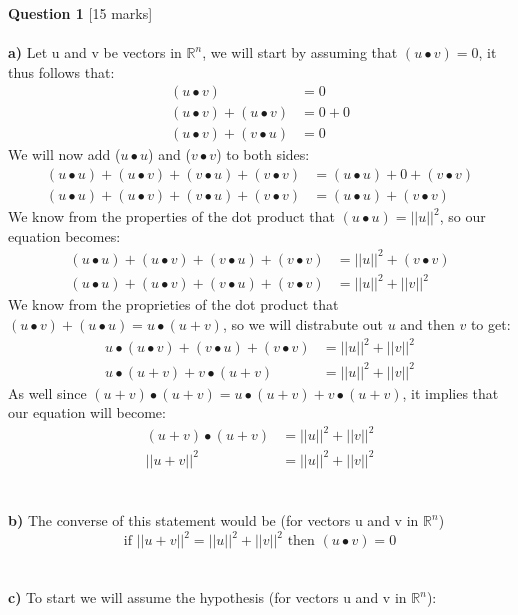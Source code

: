 \documentclass[11pt]{article}
\begin{document}
\textbf{Question 1} [15 marks] \\\\
\textbf{a)} Let u and v be vectors in $\mathbb{R}^n$, we will start by assuming that $(u \bullet v) = 0$, it thus follows that:
\begin{align*}
(u \bullet v)  &= 0 \\
(u \bullet v)  + (u \bullet v) &= 0 + 0\\
(u \bullet v) + (v \bullet u) &= 0
\end{align*}
We will now add ($u \bullet u$) and ($v \bullet v$) to both sides:
\begin{align*}
(u \bullet u) + (u \bullet v)  + (v \bullet u) + (v \bullet v)  &=(u \bullet u) + 0 + (v \bullet v)\\
(u \bullet u) + (u \bullet v)  + (v \bullet u) + (v \bullet v)  &=(u \bullet u) + (v \bullet v)
\end{align*}
We know from the properties of the dot product that $(u\bullet u) = ||u||^2$, so our equation becomes:
\begin{align*}
(u \bullet u) + (u \bullet v)  + (v \bullet u) + (v \bullet v)  &=||u||^2 + (v \bullet v)\\
(u \bullet u) + (u \bullet v)  + (v \bullet u) + (v \bullet v)  &=||u||^2 + ||v||^2
\end{align*}
We know from the proprieties of the dot product that $(u \bullet v) + (u \bullet u) = u \bullet (u+ v)$, so we will distrabute out $u$ and then $v$ to get:
\begin{align*}
u \bullet (u \bullet v)  + (v \bullet u) + (v \bullet v)  &=||u||^2 + ||v||^2\\
u \bullet (u + v) +  v \bullet (u + v) &=||u||^2 + ||v||^2
\end{align*}
As well since $(u + v) \bullet (u + v)  = u \bullet (u + v) +  v \bullet (u + v)$, it implies that our equation will become:
\begin{align*}
(u + v) \bullet (u + v) &=||u||^2 + ||v||^2 \\
||u + v||^2 &=||u||^2 + ||v||^2
\end{align*}\\\\
\textbf{b)} The converse of this statement would be (for vectors u and v in $\mathbb{R}^n$)
\[ \text{if } ||u + v||^2 = ||u||^2 + ||v||^2 \text{ then } (u \bullet v) = 0 \]\\\\
\textbf{c)} To start we will assume the hypothesis (for vectors u and v in $\mathbb{R}^n$):
\end{document}
